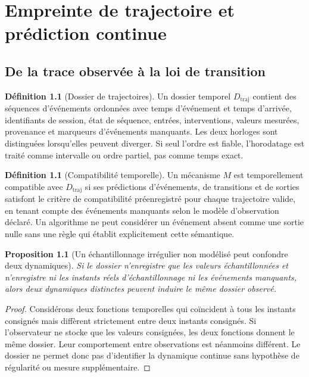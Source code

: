 \documentclass[11pt,oneside]{book}
\newtheorem{proposition}[theoreme]{Proposition}
\theoremstyle{definition}
\newtheorem{definition}[theoreme]{Définition}
\theoremstyle{remark}
\newcommand{\1}{\mathbf 1}
\begin{document}
\chapter{Empreinte de trajectoire et prédiction continue}
\section{De la trace observée à la loi de transition}
\begin{definition}[Dossier de trajectoires]
Un dossier temporel $D_{\mathrm{traj}}$ contient des séquences d'événements ordonnées avec temps d'événement et temps d'arrivée, identifiants de session, état de séquence, entrées, interventions, valeurs mesurées, provenance et marqueurs d'événements manquants. Les deux horloges sont distinguées lorsqu'elles peuvent diverger. Si seul l'ordre est fiable, l'horodatage est traité comme intervalle ou ordre partiel, pas comme temps exact.
\end{definition}

\begin{definition}[Compatibilité temporelle]
Un mécanisme $M$ est temporellement compatible avec $D_{\mathrm{traj}}$ si ses prédictions d'événements, de transitions et de sorties satisfont le critère de compatibilité préenregistré pour chaque trajectoire valide, en tenant compte des événements manquants selon le modèle d'observation déclaré. Un algorithme ne peut considérer un événement absent comme une sortie nulle sans une règle qui établit explicitement cette sémantique.
\end{definition}

\begin{proposition}[Un échantillonnage irrégulier non modélisé peut confondre deux dynamiques]
Si le dossier n'enregistre que les valeurs échantillonnées et n'enregistre ni les instants réels d'échantillonnage ni les événements manquants, alors deux dynamiques distinctes peuvent induire le même dossier observé.
\end{proposition}
\begin{proof}
Considérons deux fonctions temporelles qui coïncident à tous les instants consignés mais diffèrent strictement entre deux instants consignés. Si l'observateur ne stocke que les valeurs consignées, les deux fonctions donnent le même dossier. Leur comportement entre observations est néanmoins différent. Le dossier ne permet donc pas d'identifier la dynamique continue sans hypothèse de régularité ou mesure supplémentaire.\end{proof}
\end{document}

